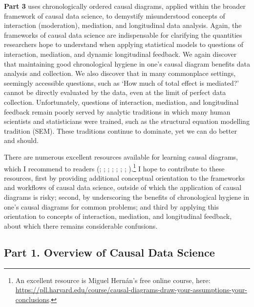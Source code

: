 \documentclass[
  singlecolumn,
  9pt]{article}
\begin{document}
\textbf{Part 3} uses chronologically ordered causal diagrams, applied
within the broader framework of causal data science, to demystify
misunderstood concepts of interaction (moderation), mediation, and
longitudinal data analysis. Again, the frameworks of causal data science
are indispensable for clarifying the quantities researchers hope to
understand when applying statistical models to questions of interaction,
mediation, and dynamic longitudinal feedback. We again discover that
maintaining good chronological hygiene in one's causal diagram benefits
data analysis and collection. We also discover that in many commonplace
settings, seemingly accessible questions, such as `How much of total
effect is mediated?' cannot be directly evaluated by the data, even at
the limit of perfect data collection. Unfortunately, questions of
interaction, mediation, and longitudinal feedback remain poorly served
by analytic traditions in which many human scientists and statisticians
were trained, such as the structural equation modelling tradition (SEM).
These traditions continue to dominate, yet we can do better and should.

There are numerous excellent resources available for learning causal
diagrams, which I recommend to readers
(;
;
;
;
;
; ; ).\footnote{An excellent resource is Miguel Hernán's free online
  course, here:
  \url{https://pll.harvard.edu/course/causal-diagrams-draw-your-assumptions-your-conclusions}.}
I hope to contribute to these resources, first by providing additional
conceptual orientation to the frameworks and workflows of causal data
science, outside of which the application of causal diagrams is risky;
second, by underscoring the benefits of chronological hygiene in one's
causal diagrams for common problems; and third by applying this
orientation to concepts of interaction, mediation, and longitudinal
feedback, about which there remains considerable confusions.

\subsection{Part 1. Overview of Causal Data
Science}\label{part-1.-overview-of-causal-data-science}
\end{document}
